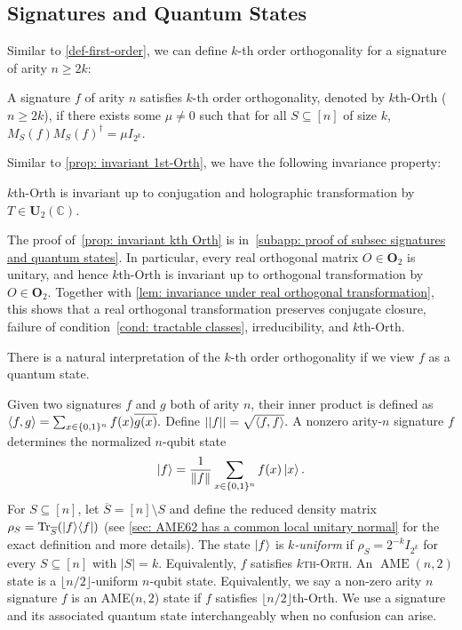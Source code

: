 
\subsection{Signatures and Quantum States}\label{subsec: signatures and quantum states}
Similar to \cref{def-first-order}, we can define $k$-th order orthogonality for a signature of arity $n\ge 2k$:
\begin{definition}\label{def: k-th order orthogonality}
    A signature $f$ of arity $n$ satisfies $k$-th order orthogonality, denoted by {\sc $k$th-Orth} ($n\ge 2k$), if there exists some $\mu\neq 0$ such that for all $S\subseteq [n]$ of size $k$, $ M_S(f)M_S(f)^\dagger=\mu I_{2^k}.$
\end{definition}

Similar to \cref{prop: invariant 1st-Orth}, we have the following invariance property:
\begin{proposition}\label{prop: invariant kth Orth}
    {\sc $k$th-Orth} is invariant up to conjugation and holographic transformation by $T\in \mathbf{U}_2(\mathbb{C})$.
\end{proposition}

The proof of~\cref{prop: invariant kth Orth} is in~\cref{subapp: proof of subsec signatures and quantum states}. In particular, every real orthogonal matrix
$O\in\mathbf{O}_2$ is unitary, and hence {\sc $k$th-Orth} is invariant up to orthogonal transformation by $O\in\mathbf{O}_2$.
Together with \cref{lem: invariance under real orthogonal transformation},
this shows that a real orthogonal transformation preserves conjugate
closure, failure of condition~\eqref{cond: tractable classes},
irreducibility, and {\sc $k$th-Orth}.

There is a natural interpretation of the $k$-th order orthogonality if we view $f$ as a quantum state.


Given two signatures $f$ and $g$ both of arity $n$, their inner product is defined as $\braket{f,g}=\sum_{x\in\{0,1\}^n}f(x)\overline{g(x)}.$
Define $||f||=\sqrt{\braket{f,f}}.$
A nonzero arity-$n$ signature $f$ determines the normalized $n$-qubit
state
\[
\ket f=\frac{1}{\|f\|}
 \sum_{x\in\{0,1\}^n}f(x)\ket x.
\]
For $S\subseteq[n]$, let $\overline S=[n]\setminus S$ and define the
reduced density matrix
\(
\rho_S=\operatorname{Tr}_{\overline S}(\ket f\!\bra f)
\)
(see \autoref{sec: AME62 has a common local unitary normal} for the exact definition and more details).
The state $\ket f$ is \emph{$k$-uniform} if
$\rho_S=2^{-k}I_{2^k}$ for every $S\subseteq[n]$ with $|S|=k$.
Equivalently, $f$ satisfies \textsc{$k$th-Orth}.  
An $\operatorname{AME}(n,2)$ state is a $\lfloor n/2\rfloor$-uniform $n$-qubit state.  
Equivalently, we say a non-zero arity $n$ signature $f$ is an AME($n,2$) state if $f$ satisfies {\sc $\lfloor n/2\rfloor$th-Orth}.
We use a signature and its
associated quantum state interchangeably when no confusion can arise.  

